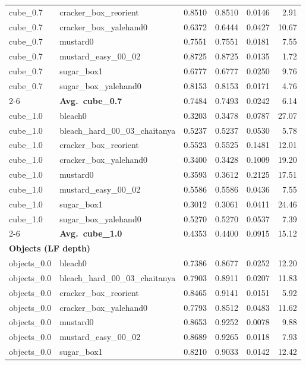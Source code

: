 \begin{longtable}{llrrrr}
  cube_0.7 & cracker\_box\_reorient & 0.8510 & 0.8510 & 0.0146 & 2.91 \\
  cube_0.7 & cracker\_box\_yalehand0 & 0.6372 & 0.6444 & 0.0427 & 10.67 \\
  cube_0.7 & mustard0 & 0.7551 & 0.7551 & 0.0181 & 7.55 \\
  cube_0.7 & mustard\_easy\_00\_02 & 0.8725 & 0.8725 & 0.0135 & 1.72 \\
  cube_0.7 & sugar\_box1 & 0.6777 & 0.6777 & 0.0250 & 9.76 \\
  cube_0.7 & sugar\_box\_yalehand0 & 0.8153 & 0.8153 & 0.0171 & 4.76 \\
  \cmidrule{2-6}
  & \textbf{Avg.~cube_0.7} & 0.7484 & 0.7493 & 0.0242 & 6.14 \\
  \midrule
  cube_1.0 & bleach0 & 0.3203 & 0.3478 & 0.0787 & 27.07 \\
  cube_1.0 & bleach\_hard\_00\_03\_chaitanya & 0.5237 & 0.5237 & 0.0530 & 5.78 \\
  cube_1.0 & cracker\_box\_reorient & 0.5523 & 0.5525 & 0.1481 & 12.01 \\
  cube_1.0 & cracker\_box\_yalehand0 & 0.3400 & 0.3428 & 0.1009 & 19.20 \\
  cube_1.0 & mustard0 & 0.3593 & 0.3612 & 0.2125 & 17.51 \\
  cube_1.0 & mustard\_easy\_00\_02 & 0.5586 & 0.5586 & 0.0436 & 7.55 \\
  cube_1.0 & sugar\_box1 & 0.3012 & 0.3061 & 0.0411 & 24.46 \\
  cube_1.0 & sugar\_box\_yalehand0 & 0.5270 & 0.5270 & 0.0537 & 7.39 \\
  \cmidrule{2-6}
  & \textbf{Avg.~cube_1.0} & 0.4353 & 0.4400 & 0.0915 & 15.12 \\
  \midrule
\multicolumn{6}{l}{\textbf{Objects (LF depth)}} \\
\midrule
  objects_0.0 & bleach0 & 0.7386 & 0.8677 & 0.0252 & 12.20 \\
  objects_0.0 & bleach\_hard\_00\_03\_chaitanya & 0.7903 & 0.8911 & 0.0207 & 11.83 \\
  objects_0.0 & cracker\_box\_reorient & 0.8465 & 0.9141 & 0.0151 & 5.92 \\
  objects_0.0 & cracker\_box\_yalehand0 & 0.7793 & 0.8512 & 0.0483 & 11.62 \\
  objects_0.0 & mustard0 & 0.8653 & 0.9252 & 0.0078 & 9.88 \\
  objects_0.0 & mustard\_easy\_00\_02 & 0.8689 & 0.9265 & 0.0118 & 7.93 \\
  objects_0.0 & sugar\_box1 & 0.8210 & 0.9033 & 0.0142 & 12.42 \\

\end{longtable}

